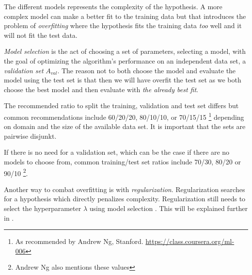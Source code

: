 The different models represents the complexity of the hypothesis. A more complex model can make a better fit to the training data but that introduces the problem of \textit{overfitting} where the hypothesis fits the training data \textit{too} well and it will not fit the test data.
\citep{norvigAI}

\textit{Model selection} is the act of choosing a set of parameters, selecting a model, with the goal of optimizing the algorithm's performance on an independent data set, a \textit{validation set} $A_{val}$.  The reason not to both choose the model and evaluate the model using the test set is that then we will have overfit the test set as we both choose the best model and then evaluate with \textit{the already best fit}. \citep{norvigAI}

The recommended ratio to split the training, validation and test set differs but common recommendations include 60/20/20, 80/10/10, or 70/15/15
\footnote{As recommended by Andrew Ng, Stanford. \url{https://class.coursera.org/ml-006}}
depending on domain and the size of the available data set. It is important that the sets are pairwise disjunkt.

If there is no need for a validation set, which can be the case if there are no models to choose from, common training/test set ratios include 70/30, 80/20 or 90/10 \cite{hu2008collaborative, norvigAI}
\footnote{Andrew Ng also mentions these values}.

Another way to combat overfitting is with \textit{regularization}. Regularization searches for a hypothesis which directly penalizes complexity.  Regularization still needs to select the hyperparameter $\lambda$ using model selection
\citep{norvigAI}. This will be explained further in .

